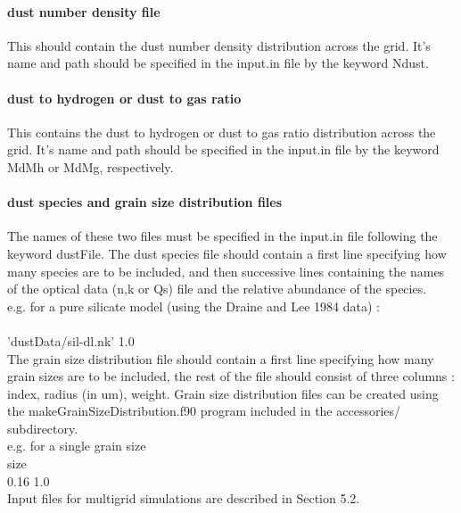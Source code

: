 \documentclass[11pt]{article}
\begin{document}
\paragraph{     dust number density file}
    This should contain the dust number density distribution across the grid. 
    It's name and path should be specified in the input.in file by the keyword 
    Ndust. 

\paragraph{     dust to hydrogen or dust to gas ratio}
    This contains the dust to hydrogen or dust to gas ratio distribution across 
    the grid. It's name and path should be specified in the input.in file by the keyword 
    MdMh or MdMg, respectively. 

\paragraph{     dust species and grain size distribution files }
    The names of these two files must be specified in the input.in file following
    the keyword dustFile. 
    The dust species file should contain a first line specifying how many species are 
    to be included, and then successive lines containing the names of the optical data (n,k or Qs) 
    file and the relative abundance of the species. \\    
\noindent    e.g. for a pure silicate model (using the Draine and Lee 1984 data) :\\
\\
\noindent       'dustData/sil-dl.nk' 1.0\\
    The grain size distribution file should contain a first 
    line specifying how many grain sizes are to be included, the rest of the file
    should consist of three columns : index, radius (in um), weight. Grain size 
    distribution files can be created using the makeGrainSizeDistribution.f90 
    program included in the accessories/ subdirectory. \\
\noindent e.g. for a single grain size \\
 size\\
 0.16 1.0\\

    Input files for multigrid simulations are described in Section 5.2. \\
\end{document}
